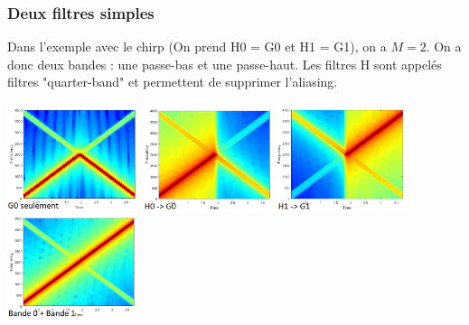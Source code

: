 \documentclass[letterpaper, 12pt]{article}
\newcommand{\alinea}{
\hspace*{0.5cm}}
\begin{document}
			\subsubsection*{Deux filtres simples}
				\alinea Dans l'exemple avec le chirp (On prend H0 = G0 et H1 = G1), 
					on a $M=2$. On a donc deux bandes : une passe-bas et une passe-haut. Les filtres H sont
					appelés filtres "quarter-band" et permettent de supprimer l'aliasing.
				\begin{center}
					\includegraphics[width=1.5in]{Images/g0} \hfill \includegraphics[width=1.5in]{Images/g0-and-h0} \hfill
					\includegraphics[width=1.5in]{Images/g1-and-h1} \hfill \includegraphics[width=1.5in]{Images/reconstruct}
				\end{center}
\end{document}
